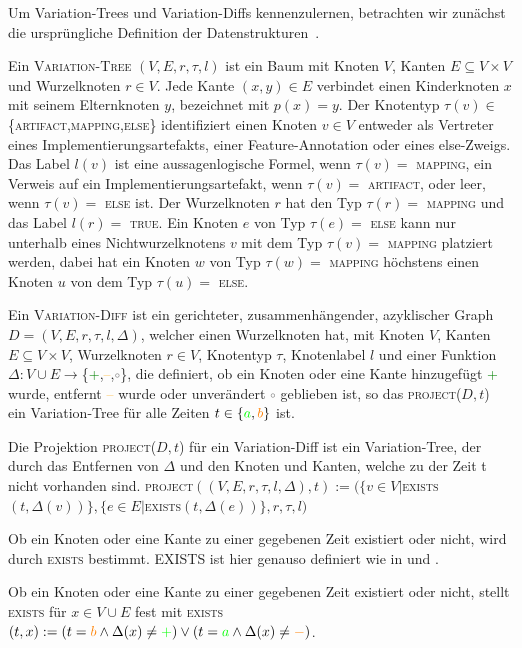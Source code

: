 Um Variation-Trees und Variation-Diffs kennenzulernen, betrachten wir zunächst die ursprüngliche Definition der Datenstrukturen~\cite{BTS+:ESECFSE22}.
\begin{definition}
	Ein \textsc{Variation-Tree}  $(V,E,r,\tau,l)$ ist ein Baum mit Knoten $V$, Kanten $E \subseteq V \times V$ und Wurzelknoten $r \in V$. Jede Kante $(x,y) \in E$ verbindet einen Kinderknoten $x$ mit seinem Elternknoten $y$, bezeichnet mit $p(x) = y$. Der Knotentyp $\tau(v) \in $ \{\textsc{artifact,mapping,else}\} identifiziert einen Knoten $v \in V$ entweder als Vertreter eines Implementierungsartefakts, einer Feature-Annotation oder eines else-Zweigs. Das Label $l(v)$ ist eine aussagenlogische Formel, wenn $\tau(v) =$ \textsc{mapping}, ein Verweis auf ein Implementierungsartefakt, wenn $\tau(v) = $ \textsc{artifact}, oder leer, wenn $\tau(v) =$ \textsc{else} ist. Der Wurzelknoten $r$ hat den Typ $\tau(r) =$ \textsc{mapping} und das Label $l(r) = $ \textsc{true}. Ein Knoten $e$ von Typ $\tau(e) =$ \textsc{else} kann nur unterhalb eines Nichtwurzelknotens $v$ mit dem Typ $\tau(v) =$ \textsc{mapping} platziert werden, dabei hat ein Knoten $w$ von Typ $\tau(w) =$ \textsc{mapping} höchstens einen Knoten $u$ von dem Typ $\tau(u) =$ \textsc{else}.
\end{definition}
\begin{definition}
	Ein \textsc{Variation-Diff} ist ein gerichteter, zusammenhängender, azyklischer Graph $D=(V,E,r,\tau,l,\Delta) $, welcher einen Wurzelknoten hat, mit Knoten $V$, Kanten $E \subseteq V \times V$, Wurzelknoten $r \in V$, Knotentyp $\tau$, Knotenlabel $l$ und einer Funktion $\Delta : V \cup E \to $\{\textcolor{green}{+},\textcolor{orange}{--},\textcolor{gray}{$\circ$}\}, die definiert, ob ein Knoten oder eine Kante hinzugefügt \textcolor{green}{+} wurde, entfernt \textcolor{orange}{--} wurde oder unverändert \textcolor{gray}{$\circ$} geblieben ist, so das \textsc{project}($D,t$) ein Variation-Tree für alle Zeiten $t \in \{\textcolor{green}{a},\textcolor{orange}{b}\}$ ist.
\end{definition}
\begin{definition}
	Die Projektion \textsc{project}($D,t$) für ein Variation-Diff ist ein Variation-Tree, der durch das Entfernen von $\Delta$ und den Knoten und Kanten, welche zu der Zeit t nicht vorhanden sind. \textsc{project}$((V,E,r,\tau,l,\Delta),t) := (\{v \in V | $\textsc{exists}$(t,\Delta(v))\},\{e \in E | $\textsc{exists}$(t,\Delta(e))\},r,\tau,l)$
\end{definition}
Ob ein Knoten oder eine Kante zu einer gegebenen Zeit existiert oder nicht, wird durch \textsc{exists} bestimmt. EXISTS ist hier genauso definiert wie in \cite{BTS+:ESECFSE22} und \cite{Moosherr23}. 
\begin{definition}
	Ob ein Knoten oder eine Kante zu einer gegebenen Zeit existiert oder nicht, stellt \textsc{exists}  für $x \in V \cup E$ fest mit \textsc{exists}$(t,x) := (t = \textcolor{orange}{b} \land \Delta(x) \neq \textcolor{green}{+}) \lor (t = \textcolor{green}{a} \land \Delta(x) \neq \textcolor{orange}{-})$.
\end{definition}

